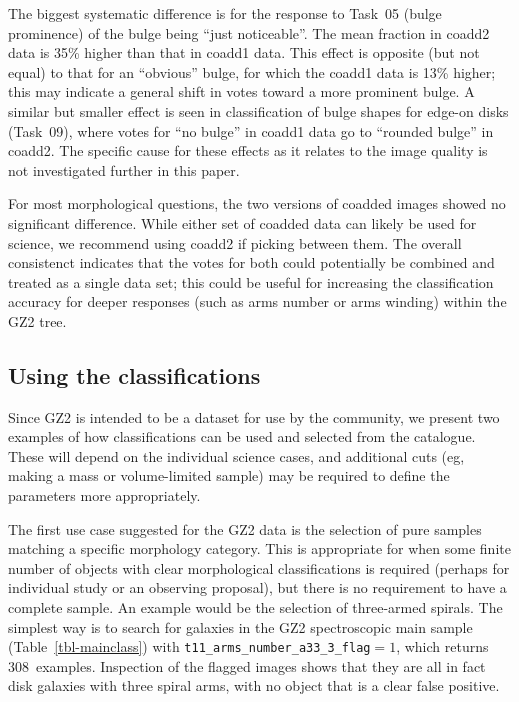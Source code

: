 \documentclass[useAMS,usenatbib]{mn2e}
\begin{document}
The biggest systematic difference is for the response to Task~05 (bulge prominence) of the bulge being ``just noticeable''. The mean fraction in coadd2 data is 35\% higher than that in coadd1 data. This effect is opposite (but not equal) to that for an ``obvious'' bulge, for which the coadd1 data is 13\% higher; this may indicate a general shift in votes toward a more prominent bulge. A similar but smaller effect is seen in classification of bulge shapes for edge-on disks (Task~09), where votes for ``no bulge'' in coadd1 data go to ``rounded bulge'' in coadd2. The specific cause for these effects as it relates to the image quality is not investigated further in this paper. 

For most morphological questions, the two versions of coadded images showed no significant difference. While either set of coadded data can likely be used for science, we recommend using coadd2 if picking between them. The overall consistenct indicates that the votes for both could potentially be combined and treated as a single data set; this could be useful for increasing the classification accuracy for deeper responses (such as arms number or arms winding) within the GZ2 tree.

\subsection{Using the classifications}\label{ssec-usingdata}

Since GZ2 is intended to be a dataset for use by the community, we present two examples of how classifications can be used and selected from the catalogue. These will depend on the individual science cases, and additional cuts (eg, making a mass or volume-limited sample) may be required to define the parameters more appropriately.

The first use case suggested for the GZ2 data is the selection of pure samples matching a specific morphology category. This is appropriate for when some finite number of objects with clear morphological classifications is required (perhaps for individual study or an observing proposal), but there is no requirement to have a complete sample. An example would be the selection of three-armed spirals. The simplest way is to search for galaxies in the GZ2 spectroscopic main sample (Table~\ref{tbl-mainclass}) with {\tt t11\_arms\_number\_a33\_3\_flag}$ = 1$, which returns 308~examples. Inspection of the flagged images shows that they are all in fact disk galaxies with three spiral arms, with no object that is a clear false positive. 
\end{document}
